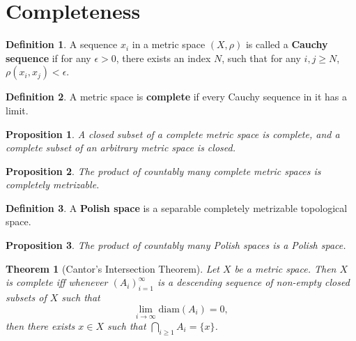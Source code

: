 \documentclass[openany]{book}
\newtheorem{proposition}{Proposition}[chapter]
\newtheorem{theorem}{Theorem}[chapter]
\theoremstyle{definition}
\newtheorem{definition}{Definition}[chapter]
\theoremstyle{remark}
\begin{document}
\section{Completeness}
\begin{definition}
    A sequence $x_i$ in a metric space $(X,\rho)$ is called a \textbf{Cauchy sequence} if for any $\epsilon>0$, there exists an index $N$, such that for any $i,j\ge N$, $\rho(x_i,x_j)<\epsilon$.
\end{definition}
\begin{definition}
    A metric space is \textbf{complete} if every Cauchy sequence in it has a limit.
\end{definition}
\begin{proposition}
    A closed subset of a complete metric space is complete, and a complete subset of an arbitrary metric space is closed.
\end{proposition}
\begin{proposition}
    The product of countably many complete metric spaces is completely metrizable.
\end{proposition}
\begin{definition}
    A \textbf{Polish space} is a separable completely metrizable topological space.
\end{definition}
\begin{proposition}
    The product of countably many Polish spaces is a Polish space.
\end{proposition}
\begin{theorem}[Cantor's Intersection Theorem]
    Let $X$ be a metric space. Then $X$ is complete iff whenever $(A_i)_{i=1}^{\infty}$ is a descending sequence of non-empty closed subsets of $X$ such that
    \begin{equation*}
        \lim_{i\to\infty}\mathrm{diam}(A_i)=0,
    \end{equation*}
    then there exists $x\in X$ such that $\bigcap_{i\ge1}A_i=\{x\}$.
\end{theorem}
\end{document}

